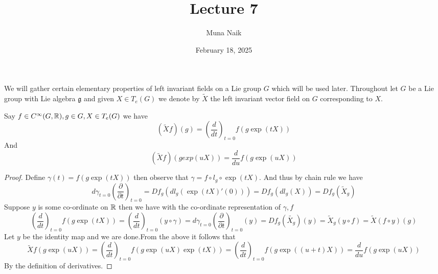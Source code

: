 \documentclass{article}
\title{Lecture 7}
\date{February 18, 2025}
\author{Muna Naik}
\begin{document}
\maketitle

We will gather certain elementary properties of left invariant fields on a Lie group $G$ which will be used later.
Throughout let $G$ be a Lie group with Lie algebra $\mathfrak{g}$ and given $X\in T_e(G)$ we denote by $\tilde{X}$ the left invariant vector field on $G$ corresponding to $X$. 

\begin{proposition}
    Say $f\in C^{\infty}(G,\mathbb R),g\in G,X\in T_e(G)$ we have $$(\tilde{X}f)(g) = \left( \frac{d}{dt} \right)_{t=0}f(g\exp(tX))$$
    And 
    $$(\tilde{X}f)(gexp(uX)) = \frac{d}{du}f(g\exp(uX))$$
\end{proposition}
\begin{proof}
    Define $\gamma(t) = f(g\exp(tX))$ then observe that $\gamma = f\circ l_g\circ \exp(tX)$. And thus by chain rule we have $$d\gamma_{t=0}\left( \frac{\partial}{\partial t} \right)_{t=0} = Df_g\left( dl_g(\exp(tX)'(0)) \right) = Df_g\left( dl_g(X) \right) = Df_g\left( \tilde{X}_g \right)$$
    Suppose $y$ is some co-ordinate on $\mathbb R$ then we have with the co-ordinate representation of $\gamma,f$ $$\left( \frac{d}{dt} \right)_{t=0}f(g\exp(tX)) = \left( \frac{d}{dt} \right)_{t=0}(y\circ\gamma) = d\gamma_{t=0}\left( \frac{\partial}{\partial t} \right)_{t=0} (y) = Df_g(\tilde{X_g})(y) = \tilde{X}_g(y\circ f) = \tilde{X}(f\circ y)(g)$$
    Let $y$ be the identity map and we are done.From the above it follows that $$\tilde{X}f(g\exp(uX)) = \left( \frac{d}{dt} \right)_{t=0}f(g\exp(uX)\exp(tX)) = \left( \frac{d}{dt} \right)_{t=0}f(g\exp((u+t)X)) = \frac{d}{du}f(g\exp(uX))$$
    By the definition of derivatives.    
\end{proof}
\end{document}
